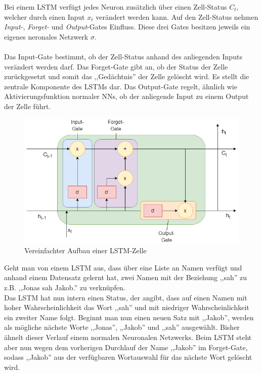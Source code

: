 Bei einem LSTM verfügt jedes Neuron zusätzlich über einen Zell-Status $C_t$, welcher durch einen Input $x_t$ verändert werden kann.
Auf den Zell-Status nehmen \textit{Input-}, \textit{Forget-} und \textit{Output}-Gates Einfluss. Diese drei Gates
besitzen jeweils ein eigenes neronales Netzwerk $\sigma$.\\\\
Das Input-Gate bestimmt, ob der Zell-Status anhand des anliegenden Inputs verändert werden darf.
Das Forget-Gate gibt an, ob der Status der Zelle zurückgesetzt und somit das ,,Gedächtnis'' der Zelle gelöscht wird. Es
stellt die zentrale Komponente des LSTMs dar.
Das Output-Gate regelt, ähnlich wie Aktivierungsfunktion normaler NNs, ob der anliegende Input zu einem Output 
der Zelle führt.

\begin{figure}[h]
    \centering
    \includegraphics[width=12.0cm]{pic/LSTM-Cell.png}
    \caption{Vereinfachter Aufbau einer LSTM-Zelle}
    \label{fig:RecNN}
\end{figure}

\newpage
Geht man von einem LSTM aus, dass über eine Liste an Namen verfügt und anhand einem Datensatz gelernt
hat, zwei Namen mit der Beziehung ,,sah'' zu z.B. ,,Jonas sah Jakob.'' zu verknüpfen.\\
Das LSTM hat nun intern einen Status, der angibt, dass auf einen Namen mit hoher Wahrscheinlichkeit das Wort 
,,sah'' und mit niedriger Wahrscheinlichkeit ein zweiter Name folgt. 
Beginnt man nun einen neuen Satz mit ,,Jakob'', werden als mögliche nächste Worte ,,Jonas'', ,,Jakob'' und ,,sah''
ausgewählt. Bisher ähnelt dieser Verlauf einem normalen Neuronalen Netzwerks. Beim LSTM
steht aber nun wegen dem vorherigen Durchlauf der Name ,,Jakob'' im Forget-Gate, sodass ,,Jakob'' aus der verfügbaren
Wortauswahl für das nächste Wort gelöscht wird.\\

